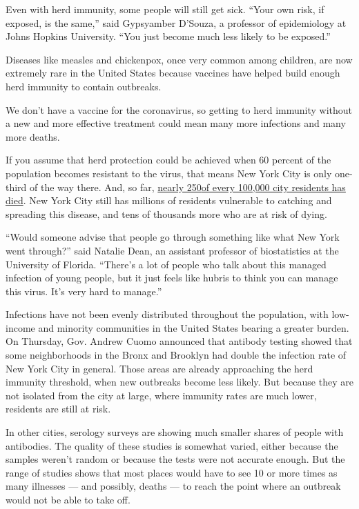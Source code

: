 Even with herd immunity, some people will still get sick. ``Your own
risk, if exposed, is the same,'' said Gypsyamber D'Souza, a professor of
epidemiology at Johns Hopkins University. ``You just become much less
likely to be exposed.''

Diseases like measles and chickenpox, once very common among children,
are now extremely rare in the United States because vaccines have helped
build enough herd immunity to contain outbreaks.

We don't have a vaccine for the coronavirus, so getting to herd immunity
without a new and more effective treatment could mean many more
infections and many more deaths.

If you assume that herd protection could be achieved when 60 percent of
the population becomes resistant to the virus, that means New York City
is only one-third of the way there. And, so far,
\href{https://www.nytimes3xbfgragh.onion/interactive/2020/us/coronavirus-us-cases.html}{nearly
250}\href{https://www.nytimes3xbfgragh.onion/interactive/2020/us/coronavirus-us-cases.html}{of
every 100,000 city residents has died}. New York City still has millions
of residents vulnerable to catching and spreading this disease, and tens
of thousands more who are at risk of dying.

``Would someone advise that people go through something like what New
York went through?'' said Natalie Dean, an assistant professor of
biostatistics at the University of Florida. ``There's a lot of people
who talk about this managed infection of young people, but it just feels
like hubris to think you can manage this virus. It's very hard to
manage.''

Infections have not been evenly distributed throughout the population,
with low-income and minority communities in the United States bearing a
greater burden. On Thursday, Gov. Andrew Cuomo announced that antibody
testing showed that some neighborhoods in the Bronx and Brooklyn had
double the infection rate of New York City in general. Those areas are
already approaching the herd immunity threshold, when new outbreaks
become less likely. But because they are not isolated from the city at
large, where immunity rates are much lower, residents are still at risk.

In other cities, serology surveys are showing much smaller shares of
people with antibodies. The quality of these studies is somewhat varied,
either because the samples weren't random or because the tests were not
accurate enough. But the range of studies shows that most places would
have to see 10 or more times as many illnesses --- and possibly, deaths
--- to reach the point where an outbreak would not be able to take off.

